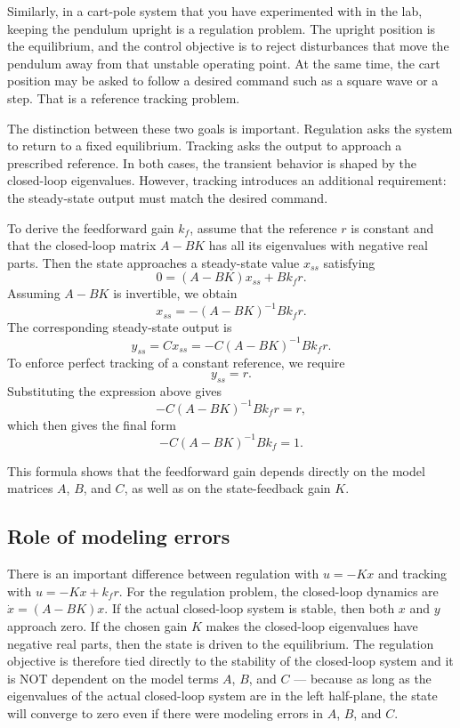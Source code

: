 \documentclass{ee122_notes}
\begin{document}
Similarly, in a cart-pole system that you have experimented with in the lab, keeping the pendulum upright is a regulation problem. The upright position is the equilibrium, and the control objective is to reject disturbances that move the pendulum away from that unstable operating point. At the same time, the cart position may be asked to follow a desired command such as a square wave or a step. That is a reference tracking problem.

The distinction between these two goals is important. Regulation asks the system to return to a fixed equilibrium. Tracking asks the output to approach a prescribed reference. In both cases, the transient behavior is shaped by the closed-loop eigenvalues. However, tracking introduces an additional requirement: the steady-state output must match the desired command.

To derive the feedforward gain \(k_f\), assume that the reference \(r\) is constant and that the closed-loop matrix \(A-BK\) has all its eigenvalues with negative real parts. Then the state approaches a steady-state value \(x_{ss}\) satisfying
\[
0=(A-BK)x_{ss}+Bk_f r.
\]
Assuming \(A-BK\) is invertible, we obtain
\[
x_{ss}=-(A-BK)^{-1}Bk_f r.
\]
The corresponding steady-state output is
\[
y_{ss}=Cx_{ss}
=
-C(A-BK)^{-1}Bk_f r.
\]
To enforce perfect tracking of a constant reference, we require
\[
y_{ss}=r.
\]
Substituting the expression above gives
\[
-C(A-BK)^{-1}Bk_f r = r,
\]
which then gives the final form
\[
-C(A-BK)^{-1}Bk_f = 1.
\]

This formula shows that the feedforward gain depends directly on the model matrices \(A\), \(B\), and \(C\), as well as on the state-feedback gain \(K\).

\subsection{Role of modeling errors}

There is an important difference between regulation with \(u=-Kx\) and tracking with \(u=-Kx+k_f r\). For the regulation problem, the closed-loop dynamics are
\(
\dot x=(A-BK)x.
\)
If the actual closed-loop system is stable, then both $x$ and $y$ approach zero. If the chosen gain \(K\) makes the closed-loop eigenvalues have negative real parts, then the state is driven to the equilibrium. The regulation objective is therefore tied directly to the stability of the closed-loop system and it is NOT dependent on the model terms $A$, $B$, and $C$ --- because as long as the eigenvalues of the actual closed-loop system are in the left half-plane, the state will converge to zero even if there were modeling errors in \(A\), \(B\), and \(C\).
\end{document}
